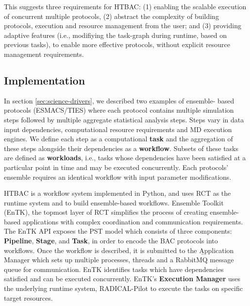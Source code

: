 This suggests three requirements for HTBAC\@: (1) enabling the scalable
execution of concurrent multiple protocols, (2) abstract the complexity of
building protocols, execution and resource management from the user; and (3)
providing adaptive features (i.e., modifiying the task-graph during runtime,
based on previous tasks), to enable more effective protocols, without explicit
resource management requirements.




\subsection{Implementation}

In section \ref{sec:science-drivers}, we described two examples of ensemble-
based protocols (ESMACS/TIES) where each protocol contains multiple simulation
steps followed by multiple aggregate statistical analysis steps. Steps vary in
data input dependencies, computational resource requirements and MD execution
engines. We define each step as a computational \textbf{task} and the
aggregation of these steps alongside their dependencies as a
\textbf{workflow}. Subsets of these tasks are defined as \textbf{workloads},
i.e., tasks whose dependencies have been satisfied at a particular point in
time and may be executed concurrently. Each protocols' ensemble requires an
identical workflow with input parameter modifications.

HTBAC is a workflow system implemented in Python, and uses RCT as the runtime
system and to build ensemble-based workflows. Ensemble Toolkit (EnTK), the
topmost layer of RCT simplifies the process of creating ensemble-based
applications with complex coordination and communication requirements. The
EnTK API exposes the PST model which consists of three components:
\textbf{Pipeline}, \textbf{Stage}, and \textbf{Task}, in order to encode the
BAC protocols into workflows. Once the workflow is described, it is submitted
to the \b{Application Manager} which sets up multiple processes, threads and a
RabbitMQ message queue for communication. EnTK identifies tasks which have
dependencies satisfied and can be executed concurrently. EnTK's
\textbf{Execution Manager} uses the underlying runtime system, RADICAL-Pilot
to execute the tasks on specific target resources.


